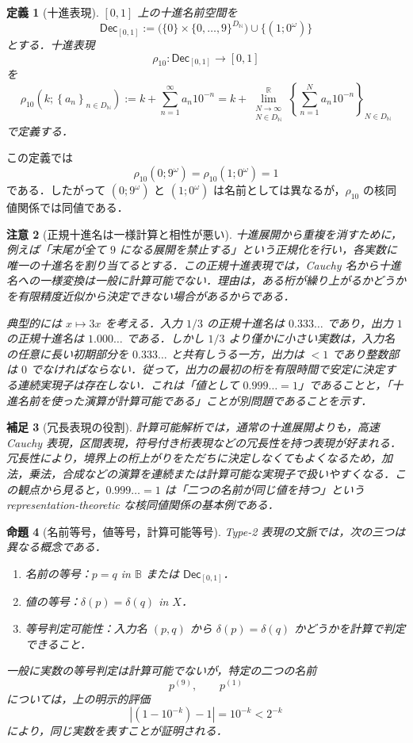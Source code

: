 \documentclass[a4paper,11pt]{ltjsarticle}
\theoremstyle{jpdef}
\newtheorem{definition}{定義}[section]
\newtheorem{remark}[definition]{補足}
\newtheorem{warning}[definition]{注意}
\theoremstyle{jpthm}
\newtheorem{proposition}[definition]{命題}
\newcommand{\N}{\mathbb{N}}
\newcommand{\R}{\mathbb{R}}
\newcommand{\DN}{D_{\N}}
\newcommand{\seq}[2]{\left\{#1\right\}_{#2}}
\newcommand{\Baire}{\mathbb{B}}
\begin{document}
\begin{definition}[十進表現]
\([0,1]\) 上の十進名前空間を
\[
  \mathsf{Dec}_{[0,1]}
  :=\bigl(\{0\}\times\{0,\ldots,9\}^{\DN}\bigr)\cup\{(1;0^\omega)\}
\]
とする．十進表現
\[
  \rho_{10}:\mathsf{Dec}_{[0,1]}\to[0,1]
\]
を
\[
  \rho_{10}(k;\seq{a_n}{n\in\DN})
  := k+\sum_{n=1}^{\infty}a_n10^{-n}
  =k+\lim_{\substack{N\to\infty\\N\in\DN}}^{\R}
      \seq{\sum_{n=1}^{N}a_n10^{-n}}{N\in\DN}
\]
で定義する．
\end{definition}

この定義では
\[
  \rho_{10}(0;9^\omega)=\rho_{10}(1;0^\omega)=1
\]
である．したがって \((0;9^\omega)\) と \((1;0^\omega)\) は名前としては異なるが，\(\rho_{10}\) の核同値関係では同値である．

\begin{warning}[正規十進名は一様計算と相性が悪い]
十進展開から重複を消すために，例えば「末尾が全て \(9\) になる展開を禁止する」という正規化を行い，各実数に唯一の十進名を割り当てるとする．この正規十進表現では，Cauchy 名から十進名への一様変換は一般に計算可能でない．理由は，ある桁が繰り上がるかどうかを有限精度近似から決定できない場合があるからである．

典型的には \(x\mapsto 3x\) を考える．入力 \(1/3\) の正規十進名は \(0.333\ldots\) であり，出力 \(1\) の正規十進名は \(1.000\ldots\) である．しかし \(1/3\) より僅かに小さい実数は，入力名の任意に長い初期部分を \(0.333\ldots\) と共有しうる一方，出力は \(<1\) であり整数部は \(0\) でなければならない．従って，出力の最初の桁を有限時間で安定に決定する連続実現子は存在しない．これは「値として \(0.999\ldots=1\)」であることと，「十進名前を使った演算が計算可能である」ことが別問題であることを示す．
\end{warning}

\begin{remark}[冗長表現の役割]
計算可能解析では，通常の十進展開よりも，高速 Cauchy 表現，区間表現，符号付き桁表現などの冗長性を持つ表現が好まれる．冗長性により，境界上の桁上がりをただちに決定しなくてもよくなるため，加法，乗法，合成などの演算を連続または計算可能な実現子で扱いやすくなる．この観点から見ると，\(0.999\ldots=1\) は「二つの名前が同じ値を持つ」という representation-theoretic な核同値関係の基本例である．
\end{remark}

\begin{proposition}[名前等号，値等号，計算可能等号]
Type-2 表現の文脈では，次の三つは異なる概念である．
\begin{enumerate}
\item 名前の等号：\(p=q\) in \(\Baire\) または \(\mathsf{Dec}_{[0,1]}\)．
\item 値の等号：\(\delta(p)=\delta(q)\) in \(X\)．
\item 等号判定可能性：入力名 \((p,q)\) から \(\delta(p)=\delta(q)\) かどうかを計算で判定できること．
\end{enumerate}
一般に実数の等号判定は計算可能でないが，特定の二つの名前
\[
  p^{(9)},\qquad p^{(1)}
\]
については，上の明示的評価
\[
  |(1-10^{-k})-1|=10^{-k}<2^{-k}
\]
により，同じ実数を表すことが証明される．
\end{proposition}
\end{document}
